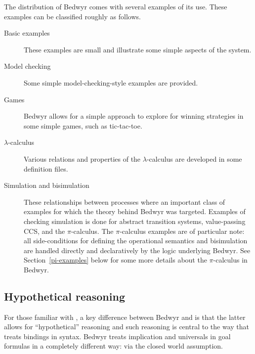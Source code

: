 The distribution of Bedwyr comes with several examples of its use.
These examples can be classified roughly as follows.

\begin{description}
\item[Basic examples] These examples are small and illustrate some
  simple aspects of the system.

\item[Model checking] Some simple model-checking-style examples are
  provided.

\item[Games] Bedwyr allows for a simple approach to explore for
  winning strategies in some simple games, such as tic-tac-toe.

\item[$\lambda$-calculus] Various relations and properties of the
  $\lambda$-calculus are developed in some definition files.

\item[Simulation and bisimulation] These relationships between
  processes where an important class of examples for which the theory
  behind Bedwyr was targeted.  Examples of checking simulation is done
  for abstract transition systems, value-passing CCS, and the
  $\pi$-calculus.  The $\pi$-calculus examples are of particular note:
  all side-conditions for defining the operational semantics and
  bisimulation are handled directly and declaratively by the logic
  underlying Bedwyr.  See Section~\ref{pi-examples} below for some more
  details about the $\pi$-calculus in Bedwyr.

\end{description}

\subsection{Hypothetical reasoning}

For those familiar with \lp{}, a key difference between
Bedwyr and \lp{} is that the latter allows for ``hypothetical''
reasoning and such reasoning is central to the way that \lp{} treats
bindings in syntax.    Bedwyr treats implication and universals in
goal formulas in a completely different way: via the closed world
assumption.

